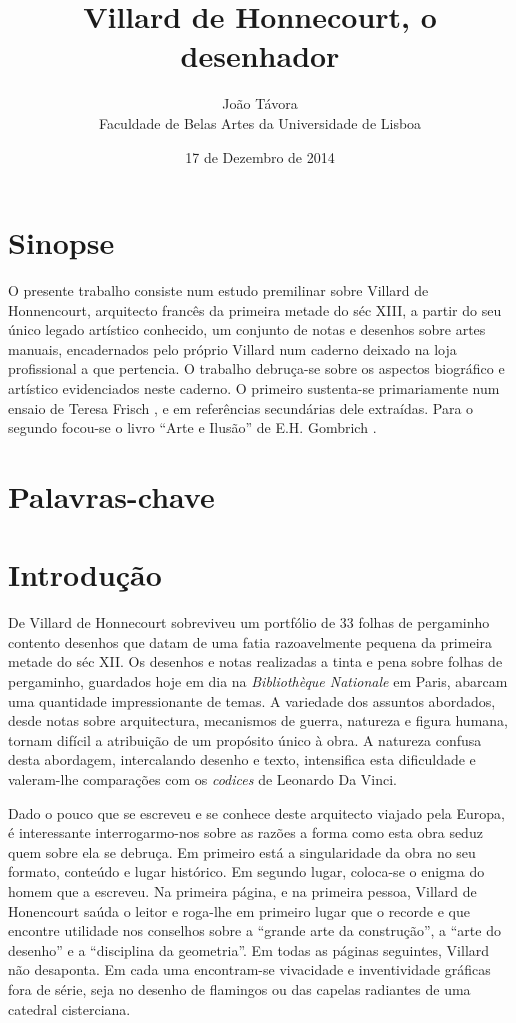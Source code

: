 \documentclass{article}
\title{Villard de Honnecourt, o desenhador}
\date{17 de Dezembro de 2014}
\author{João Távora \\Faculdade de Belas Artes da Universidade de Lisboa}
\begin{document}
\maketitle

\section{Sinopse}

O presente trabalho consiste num estudo premilinar sobre Villard de
Honnencourt, arquitecto francês da primeira metade do séc XIII, a
partir do seu único legado artístico conhecido, um conjunto de notas e
desenhos sobre artes manuais, encadernados pelo próprio Villard num
caderno deixado na loja profissional a que pertencia. O trabalho
debruça-se sobre os aspectos biográfico e artístico evidenciados neste
caderno. O primeiro sustenta-se primariamente num ensaio de Teresa
Frisch \cite{teresa}, e em referências secundárias dele
extraídas. Para o segundo focou-se o livro ``Arte e Ilusão'' de
E.H. Gombrich \cite{gombrich}.

\section{Palavras-chave}

\section{Introdução}

De Villard de Honnecourt sobreviveu um portfólio de 33 folhas de
pergaminho contento desenhos que datam de uma fatia razoavelmente
pequena da primeira metade do séc XII. Os desenhos e notas realizadas
a tinta e pena sobre folhas de pergaminho, guardados hoje em dia na
\emph{Bibliothèque Nationale} em Paris, abarcam uma quantidade
impressionante de temas. A variedade dos assuntos abordados, desde
notas sobre arquitectura, mecanismos de guerra, natureza e figura
humana, tornam difícil a atribuição de um propósito único à obra. A
natureza confusa desta abordagem, intercalando desenho e texto,
intensifica esta dificuldade e valeram-lhe comparações com os
\emph{codices} de Leonardo Da Vinci.

Dado o pouco que se escreveu e se conhece deste arquitecto viajado
pela Europa, é interessante interrogarmo-nos sobre as razões a forma
como esta obra seduz quem sobre ela se debruça. Em primeiro está a
singularidade da obra no seu formato, conteúdo e lugar histórico. Em
segundo lugar, coloca-se o enigma do homem que a escreveu. Na primeira
página, e na primeira pessoa, Villard de Honencourt saúda o leitor e
roga-lhe em primeiro lugar que o recorde e que encontre utilidade nos
conselhos sobre a ``grande arte da construção'', a ``arte do desenho''
e a ``disciplina da geometria''. Em todas as páginas seguintes,
Villard não desaponta. Em cada uma encontram-se vivacidade e
inventividade gráficas fora de série, seja no desenho de flamingos ou
das capelas radiantes de uma catedral cisterciana.
\end{document}
